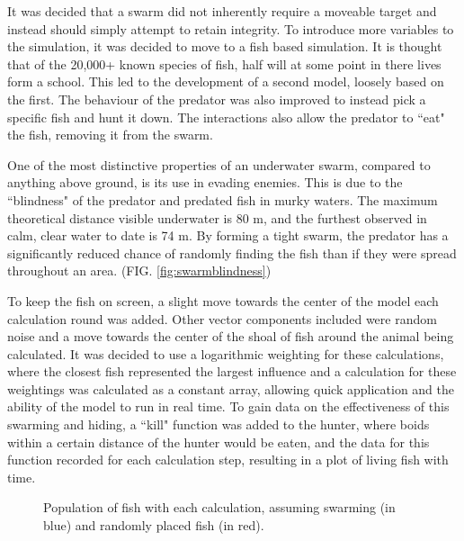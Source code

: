 \documentclass[
reprint,
showpacs,
preprintnumbers,
bibnotes,
amsmath,
amssymb,
aps,
pra,
floatfix,
]{revtex4-1}
\begin{document}
It was decided that a swarm did not inherently require a moveable target and instead should simply attempt to retain integrity.
To introduce more variables to the simulation, it was decided to move to a fish based simulation.
It is thought that of the 20,000+ known species of fish, half will at some point in there lives form a school.\cite{fishschools}
This led to the development of a second model, loosely based on the first.
The behaviour of the predator was also improved to instead pick a specific fish and hunt it down.
The interactions also allow the predator to ``eat" the fish, removing it from the swarm.

One of the most distinctive properties of an underwater swarm, compared to anything above ground, is its use in evading enemies.
This is due to the ``blindness" of the predator and predated fish in murky waters.
The maximum theoretical distance visible underwater is 80 m, and the furthest observed in calm, clear water to date is 74 m.\cite{underwatervision}
By forming a tight swarm, the predator has a significantly reduced chance of randomly finding the fish than if they were spread throughout an area. (FIG. \ref{fig:swarmblindness})

To keep the fish on screen, a slight move towards the center of the model each calculation round was added.
Other vector components included were random noise and a move towards the center of the shoal of fish around the animal being calculated.
It was decided to use a logarithmic weighting for these calculations, where the closest fish represented the largest influence and a calculation for these weightings was calculated as a constant array, allowing quick application and the ability of the model to run in real time.
To gain data on the effectiveness of this swarming and hiding, a ``kill" function was added to the hunter, where boids within a certain distance of the hunter would be eaten, and the data for this function recorded for each calculation step, resulting in a plot of living fish with time.

\begin{figure}[!htp]
		\centering
		

	\caption{Population of fish with each calculation, assuming swarming (in blue) and randomly placed fish (in red).}
	\label{fig:population}
\end{figure}
\end{document}
